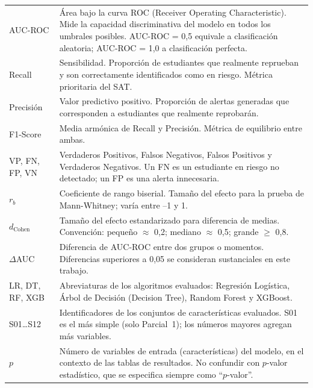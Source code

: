 \documentclass[12pt, letterpaper, openany]{report}
\begin{document}
\begin{longtable}{p{3.6cm} p{10.2cm}}
  AUC-ROC & Área bajo la curva ROC (Receiver Operating Characteristic). Mide la capacidad discriminativa del modelo en todos los umbrales posibles. AUC-ROC = 0,5 equivale a clasificación aleatoria; AUC-ROC = 1,0 a clasificación perfecta. \\[4pt]

  Recall & Sensibilidad. Proporción de estudiantes que realmente reprueban y son correctamente identificados como en riesgo. Métrica prioritaria del SAT. \\[4pt]

  Precisión & Valor predictivo positivo. Proporción de alertas generadas que corresponden a estudiantes que realmente reprobarán. \\[4pt]

  F1-Score & Media armónica de Recall y Precisión. Métrica de equilibrio entre ambas. \\[4pt]

  VP, FN, FP, VN & Verdaderos Positivos, Falsos Negativos, Falsos Positivos y Verdaderos Negativos. Un FN es un estudiante en riesgo no detectado; un FP es una alerta innecesaria. \\[4pt]

  $r_b$ & Coeficiente de rango biserial. Tamaño del efecto para la prueba de Mann-Whitney; varía entre --1 y 1. \\[4pt]

  $d_\text{Cohen}$ & Tamaño del efecto estandarizado para diferencia de medias. Convención: pequeño $\approx$ 0,2; mediano $\approx$ 0,5; grande $\geq$ 0,8. \\[4pt]

  $\Delta$AUC & Diferencia de AUC-ROC entre dos grupos o momentos. Diferencias superiores a 0,05 se consideran sustanciales en este trabajo. \\[4pt]

  LR, DT, RF, XGB & Abreviaturas de los algoritmos evaluados: Regresión Logística, Árbol de Decisión (Decision Tree), Random Forest y XGBoost. \\[4pt]

  S01\ldots S12 & Identificadores de los conjuntos de características evaluados. S01 es el más simple (solo Parcial~1); los números mayores agregan más variables. \\[4pt]

  $p$ & Número de variables de entrada (características) del modelo, en el contexto de las tablas de resultados. No confundir con $p$-valor estadístico, que se especifica siempre como ``$p$-valor''. \\[4pt]


\end{longtable}
\end{document}
